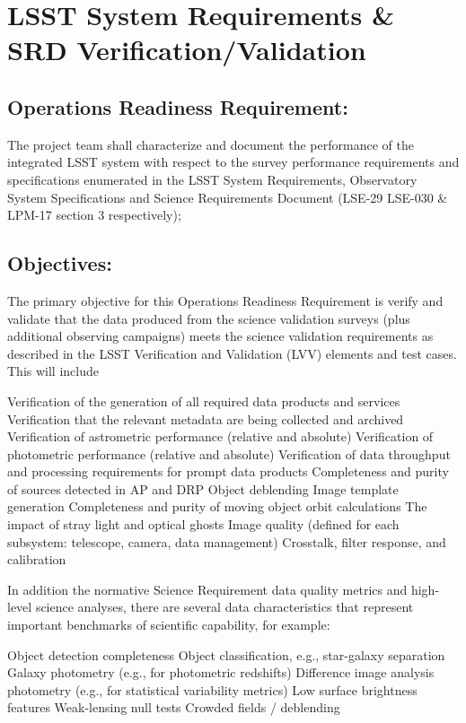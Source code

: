 \section{LSST System Requirements \& SRD Verification/Validation}  \label{sec:srd}

\subsection{Operations Readiness Requirement:}

The project team shall characterize and document the performance of the integrated LSST system with respect to the survey performance requirements and specifications enumerated in the LSST System Requirements, Observatory System Specifications and Science Requirements Document (LSE-29 LSE-030 \& LPM-17 section 3 respectively);

\subsection{Objectives:}

The primary objective for this Operations Readiness Requirement is verify and validate that the data produced from the science validation surveys (plus additional observing campaigns) meets the science validation requirements as described in the LSST Verification and Validation (LVV) elements and test cases. This will include

    Verification of the generation of all required data products and services
    Verification that the relevant metadata are being collected and archived
    Verification of astrometric performance (relative and absolute)
    Verification of photometric performance (relative and absolute)
    Verification of data throughput and processing requirements for prompt data products  
    Completeness and purity of sources detected in AP and DRP
    Object deblending
    Image template generation
    Completeness and purity of moving object orbit calculations
    The impact of stray light and optical ghosts 
    Image quality (defined for each subsystem: telescope, camera, data management)
    Crosstalk, filter response, and calibration

In addition the normative Science Requirement data quality metrics and high-level science analyses, there are several data characteristics that represent important benchmarks of scientific capability, for example:

    Object detection completeness
    Object classification, e.g., star-galaxy separation
    Galaxy photometry (e.g., for photometric redshifts)
    Difference image analysis photometry (e.g., for statistical variability metrics)
    Low surface brightness features
    Weak-lensing null tests
    Crowded fields / deblending

